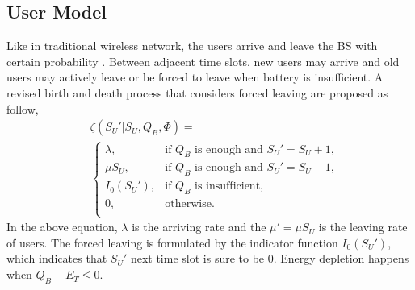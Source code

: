 \documentclass[conference]{IEEEtran}
\begin{document}
\subsection{User Model}
Like in traditional wireless network, the users arrive and leave the BS with certain probability \cite{5}.
Between adjacent time slots, new users may arrive and
old users may actively leave or be forced to leave when battery is insufficient.
A revised birth and death process that considers forced leaving are proposed as follow,
\begin{align}\label{formula1}
&\zeta\left(S_U'| S_U, Q_B, \Phi\right) = \nonumber\\
&\begin{cases}
	\lambda, &\mbox{if $Q_B$ is enough and $S_U' = S_U + 1$,}\\
	\mu S_U, &\mbox{if $Q_B$ is enough and $S_U' = S_U - 1$,}\\
	I_0\left(S_U'\right), &\mbox{if $Q_B$ is insufficient,}\\
	0, &\mbox{otherwise.}\\
\end{cases}
\end{align}
In the above equation, \(\lambda\) is the arriving rate and
the \(\mu' = \mu S_U\) is the leaving rate of users.
The forced leaving is formulated by the indicator function \(I_0\left(S_U'\right)\),
which indicates that \(S_U'\) next time slot is sure to be \(0\).
Energy depletion happens when \(Q_B- E_T \leq 0\).
\end{document}
